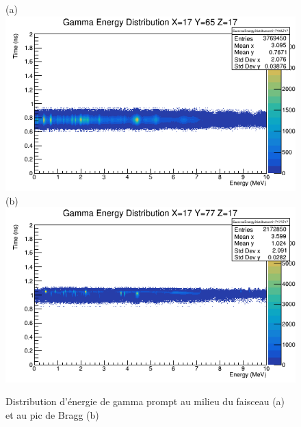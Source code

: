 \documentclass[11pt,a4paper,oldfontcommands]{memoir}
\begin{document}
\begin{figure}[h!]
\centering
\subfloat(a){\includegraphics[scale=0.37]{CT/130/FaisceauGamma.png}}
\subfloat(b){\includegraphics[scale=0.37]{CT/130/BraggGamma.png}}
\caption{Distribution d'énergie de gamma prompt au milieu du faisceau (a) et au pic de Bragg (b)}
\label{130 pg}
\end{figure}
\newpage
\end{document}
